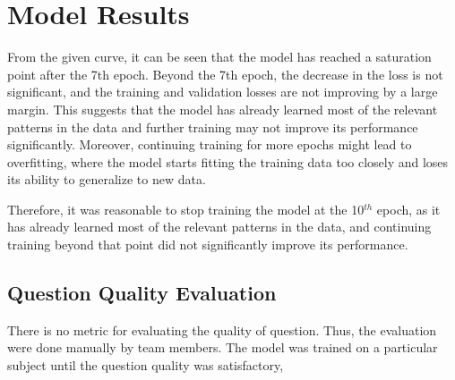 \documentclass[12pt]{report}
\begin{document}
\section{Model Results}

From the given curve, it can be seen that  the model has reached a saturation point after the 7th epoch. Beyond the 7th epoch, the decrease in the loss is not significant, and the training and validation losses are not improving by a large margin. This suggests that the model has already learned most of the relevant patterns in the data and further training may not improve its performance significantly. Moreover, continuing training for more epochs might lead to overfitting, where the model starts fitting the training data too closely and loses its ability to generalize to new data.

Therefore, it was reasonable to stop training the model at the 10{$^{th}$} epoch, as it has already learned most of the relevant patterns in the data, and continuing training beyond that point did not significantly improve its performance.

\subsection{Question Quality Evaluation}
There is no metric for evaluating the quality of question. Thus, the evaluation were done manually by team members. The model was trained on a particular subject until the question quality was satisfactory,
\end{document}
